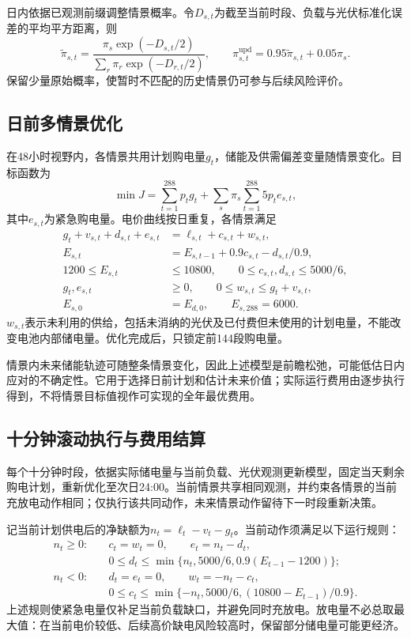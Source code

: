 日内依据已观测前缀调整情景概率。令$D_{s,t}$为截至当前时段、负载与光伏标准化误差的平均平方距离，则
\begin{equation}
\widetilde\pi_{s,t}=\frac{\pi_s\exp(-D_{s,t}/2)}{\sum_r\pi_r\exp(-D_{r,t}/2)},\qquad
\pi_{s,t}^{\mathrm{upd}}=0.95\widetilde\pi_{s,t}+0.05\pi_s.
\end{equation}
保留少量原始概率，使暂时不匹配的历史情景仍可参与后续风险评价。

\subsection{日前多情景优化}
在48小时视野内，各情景共用计划购电量$g_t$，储能及供需偏差变量随情景变化。目标函数为
\begin{equation}
\min J=\sum_{t=1}^{288}p_tg_t+\sum_s\pi_s\sum_{t=1}^{288}5p_te_{s,t},
\end{equation}
其中$e_{s,t}$为紧急购电量。电价曲线按日重复，各情景满足
\begin{align}
g_t+v_{s,t}+d_{s,t}+e_{s,t}&=\ell_{s,t}+c_{s,t}+w_{s,t},\\
E_{s,t}&=E_{s,t-1}+0.9c_{s,t}-d_{s,t}/0.9,\\
1200\le E_{s,t}&\le10800,\qquad 0\le c_{s,t},d_{s,t}\le5000/6,\\
g_t,e_{s,t}&\ge0,\qquad 0\le w_{s,t}\le g_t+v_{s,t},\\
E_{s,0}&=E_{d,0},\qquad E_{s,288}=6000.
\end{align}
$w_{s,t}$表示未利用的供给，包括未消纳的光伏及已付费但未使用的计划电量，不能改变电池内部储电量。优化完成后，只锁定前144段购电量。

情景内未来储能轨迹可随整条情景变化，因此上述模型是前瞻松弛，可能低估日内应对的不确定性。它用于选择日前计划和估计未来价值；实际运行费用由逐步执行得到，不将情景目标值视作可实现的全年最优费用。

\subsection{十分钟滚动执行与费用结算}
每个十分钟时段，依据实际储电量与当前负载、光伏观测更新模型，固定当天剩余购电计划，重新优化至次日24:00。当前情景共享相同观测，并约束各情景的当前充放电动作相同；仅执行该共同动作，未来情景动作留待下一时段重新决策。

记当前计划供电后的净缺额为$n_t=\ell_t-v_t-g_t$。当前动作须满足以下运行规则：
\begin{align}
n_t\ge0:\quad &c_t=w_t=0,\qquad e_t=n_t-d_t,\\
&0\le d_t\le\min\{n_t,5000/6,0.9(E_{t-1}-1200)\};\\
n_t<0:\quad &d_t=e_t=0,\qquad w_t=-n_t-c_t,\\
&0\le c_t\le\min\{-n_t,5000/6,(10800-E_{t-1})/0.9\}.
\end{align}
上述规则使紧急电量仅补足当前负载缺口，并避免同时充放电。放电量不必总取最大值：在当前电价较低、后续高价缺电风险较高时，保留部分储电量可能更经济。

